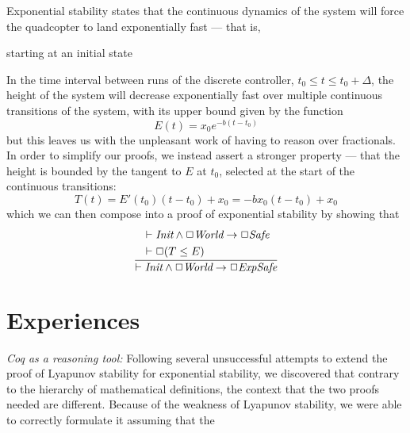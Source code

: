 \documentclass[10pt]{sigplanconf}
\begin{document}



Exponential stability states that the continuous dynamics of the system will force the quadcopter to land exponentially fast --- that is,

starting at an initial state

In the time interval between runs of the discrete controller, $t_0\leq t \leq t_0+\Delta$, the height of the system will decrease exponentially fast over multiple continuous transitions of the system, with its upper bound given by the function
 \[E(t)=x_0e^{-b(t-t_0)}\]
but this leaves us with the unpleasant work of having to reason over fractionals. In order to simplify our proofs, we instead assert a stronger property --- that the height is bounded by the tangent to $E$ at $t_0$, selected at the start of the continuous transitions:
\[T(t) = E'(t_0)(t-t_0)+x_0 = -bx_0(t-t_0)+x_0\]
which we can then compose into a proof of exponential stability by showing that
\[
  \frac
  {\begin{aligned}
      & \vdash \emph{Init} \land \Box \emph{World} \rightarrow \Box \emph{Safe} \\
      & \vdash \Box (T\leq E)
    \end{aligned}}
  {\vdash \emph{Init} \land \Box \emph{World} \rightarrow \Box \emph{ExpSafe}}
\]



\section {Experiences}

\emph{Coq as a reasoning tool: } Following several unsuccessful attempts to extend the proof of Lyapunov stability for exponential stability, we discovered that contrary to the hierarchy of mathematical definitions, the context that the two proofs needed are different. Because of the weakness of Lyapunov stability, we were able to correctly formulate it assuming that the


\end{document}
